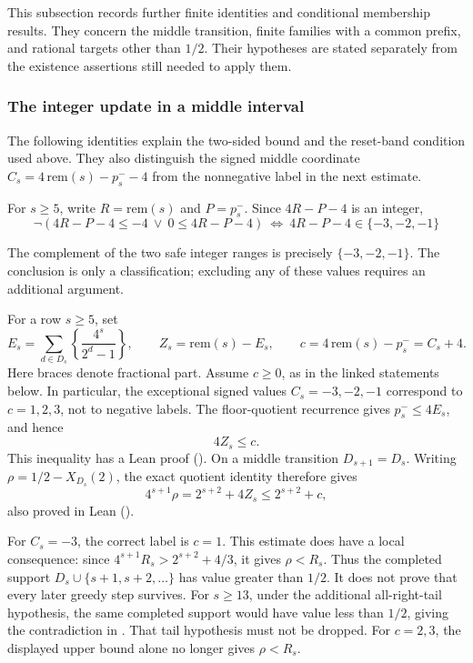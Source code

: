 This subsection records further finite identities and conditional
membership results.  They concern the
middle transition, finite families with a common prefix, and rational
targets other than $1/2$.  Their hypotheses are stated separately from
the existence assertions still needed to apply them.

\subsubsection{The integer update in a middle interval}

The following identities explain the two-sided bound and the reset-band
condition used above.  They also distinguish the signed middle coordinate
$C_s=4\,\mathrm{rem}(s)-p_s^- -4$ from the nonnegative label in the
next estimate.

\begin{prop}\label{prop:unsafe-middle-range-exactly-three}
For $s\ge5$, write $R=\mathrm{rem}(s)$ and $P=p_s^-$.  Since
$4R-P-4$ is an integer,
\[
\neg(4R-P-4\le-4\ \vee\ 0\le 4R-P-4)\ \Longleftrightarrow\ 4R-P-4\in\{-3,-2,-1\}
\]
\end{prop}
The complement of the two safe integer ranges is precisely
$\{-3,-2,-1\}$.  The conclusion is only a classification; excluding
any of these values requires an additional argument.

For a row $s\ge5$, set
\[
 E_s=\sum_{d\in D_s}\left\{\frac{4^s}{2^d-1}\right\},\qquad
 Z_s=\mathrm{rem}(s)-E_s,\qquad
 c=4\,\mathrm{rem}(s)-p_s^-=C_s+4.
\]
Here braces denote fractional part.  Assume $c\ge0$, as in the linked
statements below.  In particular, the exceptional signed values
$C_s=-3,-2,-1$ correspond to $c=1,2,3$, not to negative labels.
The floor-quotient recurrence gives $p_s^-\le4E_s$, and hence
\[
 4Z_s\le c.
\]
This inequality has a Lean proof
().
On a middle transition $D_{s+1}=D_s$.  Writing
$\rho=1/2-X_{D_s}(2)$, the exact quotient identity therefore gives
\[
 4^{s+1}\rho=2^{s+2}+4Z_s\le2^{s+2}+c,
\]
also proved in Lean
().

For $C_s=-3$, the correct label is $c=1$.  This estimate does have a
local consequence: since
$4^{s+1}R_s>2^{s+2}+4/3$, it gives $\rho<R_s$.
Thus the completed support $D_s\cup\{s+1,s+2,\ldots\}$ has value
greater than $1/2$.  It does not prove that every later greedy step
survives.  For $s\ge13$, under the additional all-right-tail hypothesis, the same
completed support would have value less than $1/2$, giving the
contradiction in
.
That tail hypothesis must not be dropped.  For $c=2,3$, the displayed
upper bound alone no longer gives $\rho<R_s$.

